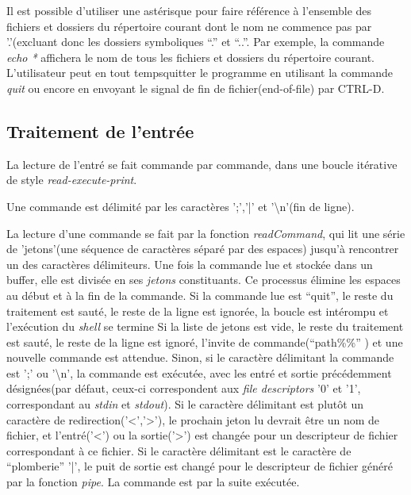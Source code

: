 \documentclass[letterpaper,12pt]{scrartcl}
\begin{document}
			Il est possible d'utiliser une astérisque pour faire référence à l'ensemble des fichiers et dossiers du répertoire courant dont le nom ne commence pas par '.'(excluant donc les dossiers symboliques ``.'' et ``..''. Par exemple, la commande \textit{echo *} affichera le nom de tous les fichiers et dossiers du répertoire courant. L'utilisateur peut en tout tempsquitter le programme en utilisant la commande \textit{quit} ou encore en envoyant le signal de fin de fichier(end-of-file) par CTRL-D.

		    \subsection{Traitement de l'entrée}
            La lecture de l'entré se fait commande par commande, dans une boucle itérative de style \textit{read-execute-print}.
            
            Une commande est délimité par les caractères ';','|' et '\textbackslash n'(fin de ligne).
            
            La lecture d'une commande se fait par la fonction \textit{readCommand}, qui lit une série de 'jetons'(une séquence de caractères séparé par des espaces) jusqu'à rencontrer un des caractères délimiteurs.
            Une fois la commande lue et stockée dans un buffer, elle est divisée en ses \textit{jetons} constituants. Ce processus élimine les espaces au début et à la fin de la commande.
            Si la commande lue est ``quit'', le reste du traitement est sauté, le reste de la ligne est ignorée, la boucle est intérompu et l'exécution du \textit{shell} se termine
            Si la liste de jetons est vide, le reste du traitement est sauté, le reste de la ligne est ignoré, l'invite de commande(``path\%\%'' ) et une nouvelle commande est attendue.                        
            Sinon, si le caractère délimitant la commande est ';' ou '\textbackslash n', la commande est exécutée, avec les entré et sortie précédemment désignées(par défaut, ceux-ci correspondent aux \textit{file descriptors} '0' et '1', correspondant au \textit{stdin} et \textit{stdout}).
            Si le caractère délimitant est plutôt un caractère de redirection('<','>'), le prochain jeton lu devrait être un nom de fichier, et l'entré('<') ou la sortie('>') est changée pour un descripteur de fichier correspondant à ce fichier.
            Si le caractère délimitant est le caractère de ``plomberie'' '|', le puit de sortie est changé pour le descripteur de fichier généré par la fonction \textit{pipe}. 
            La commande est par la suite exécutée.
            
\end{document}
